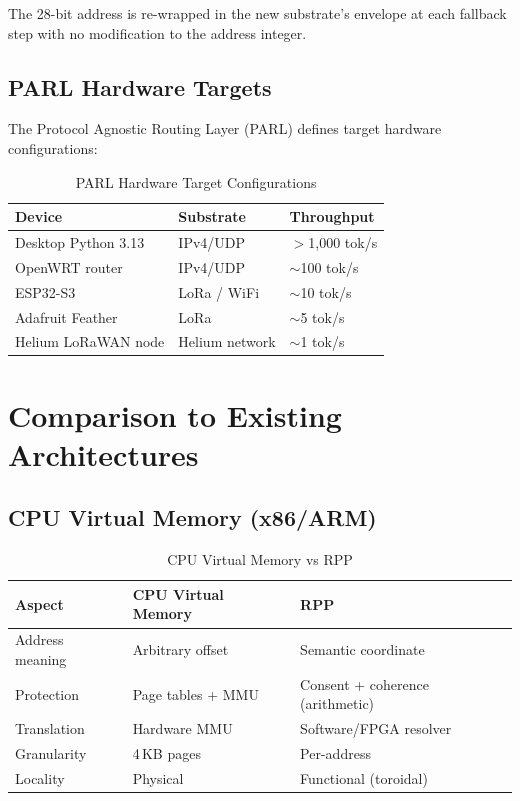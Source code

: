 \documentclass[11pt,a4paper]{article}
\begin{document}
The 28-bit address is re-wrapped in the new substrate's envelope at each fallback step with no modification to the address integer.

\subsection{PARL Hardware Targets}

The Protocol Agnostic Routing Layer (PARL) defines target hardware configurations:

\begin{table}[h]
\centering
\begin{tabular}{lll}
\toprule
\textbf{Device} & \textbf{Substrate} & \textbf{Throughput} \\
\midrule
Desktop Python 3.13 & IPv4/UDP & $>$1{,}000 tok/s \\
OpenWRT router & IPv4/UDP & $\sim$100 tok/s \\
ESP32-S3 & LoRa / WiFi & $\sim$10 tok/s \\
Adafruit Feather & LoRa & $\sim$5 tok/s \\
Helium LoRaWAN node & Helium network & $\sim$1 tok/s \\
\bottomrule
\end{tabular}
\caption{PARL Hardware Target Configurations}
\label{tab:parl}
\end{table}

\section{Comparison to Existing Architectures}

\subsection{CPU Virtual Memory (x86/ARM)}

\begin{table}[h]
\centering
\begin{tabular}{lll}
\toprule
\textbf{Aspect} & \textbf{CPU Virtual Memory} & \textbf{RPP} \\
\midrule
Address meaning & Arbitrary offset & Semantic coordinate \\
Protection & Page tables + MMU & Consent + coherence (arithmetic) \\
Translation & Hardware MMU & Software/FPGA resolver \\
Granularity & 4\,KB pages & Per-address \\
Locality & Physical & Functional (toroidal) \\
\bottomrule
\end{tabular}
\caption{CPU Virtual Memory vs RPP}
\end{table}
\end{document}
